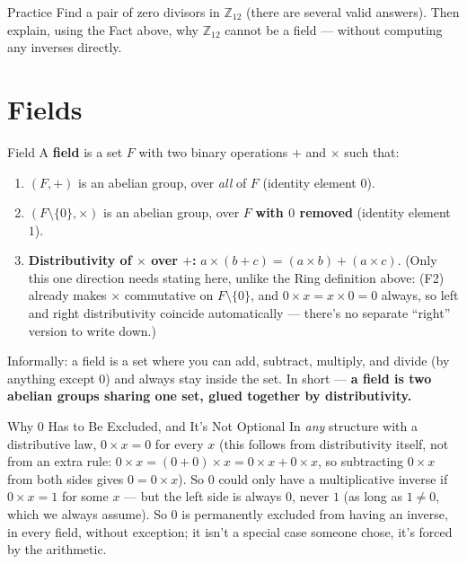 \begin{exercisebox}{Practice}
Find a pair of zero divisors in $\mathbb{Z}_{12}$ (there are several valid answers). Then explain, using the Fact above, why $\mathbb{Z}_{12}$ cannot be a field --- without computing any inverses directly.
\end{exercisebox}

\section{Fields}
\label{sec:L1:fields}

\begin{defbox}{Field}
A \textbf{field} is a set $F$ with two binary operations $+$ and $\times$ such that:
\begin{enumerate}[leftmargin=*, label=(F\arabic*)]
  \item $(F, +)$ is an abelian group, over \emph{all} of $F$ (identity element $0$).
  \item $(F \setminus \{0\}, \times)$ is an abelian group, over $F$ \textbf{with $0$ removed} (identity element $1$).
  \item \textbf{Distributivity of $\times$ over $+$:} $a \times (b+c) = (a\times b) + (a \times c)$. (Only this one direction needs stating here, unlike the Ring definition above: (F2) already makes $\times$ commutative on $F\setminus\{0\}$, and $0\times x = x\times 0 = 0$ always, so left and right distributivity coincide automatically --- there's no separate ``right'' version to write down.)
\end{enumerate}
Informally: a field is a set where you can add, subtract, multiply, and divide (by anything except $0$) and always stay inside the set. In short --- \textbf{a field is two abelian groups sharing one set, glued together by distributivity.}
\end{defbox}

\begin{rmkbox}{Why $0$ Has to Be Excluded, and It's Not Optional}
In \emph{any} structure with a distributive law, $0 \times x = 0$ for every $x$ (this follows from distributivity itself, not from an extra rule: $0 \times x = (0+0)\times x = 0\times x + 0 \times x$, so subtracting $0\times x$ from both sides gives $0 = 0 \times x$). So $0$ could only have a multiplicative inverse if $0 \times x = 1$ for some $x$ --- but the left side is always $0$, never $1$ (as long as $1 \ne 0$, which we always assume). So $0$ is permanently excluded from having an inverse, in every field, without exception; it isn't a special case someone chose, it's forced by the arithmetic.
\end{rmkbox}

